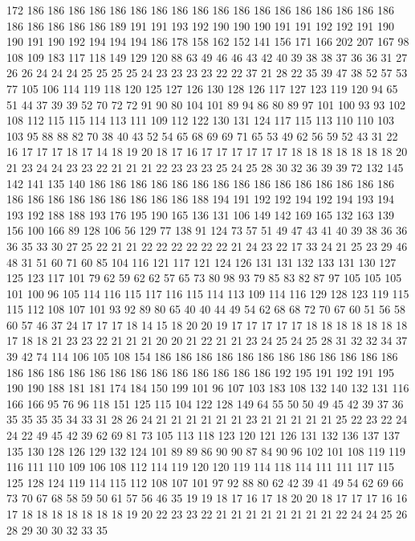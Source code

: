 172 186 186 186 186 186 186 186 186 186 186 186 186 186 186 186 186 186 186 186
186 186 186 186 189 191 191 193 192 190 190 190 191 191 192 192 191 190 190 191
190 192 194 194 194 186 178 158 162 152 141 156 171 166 202 207 167 98 108 109
183 117 118 149 129 120 88 63 49 46 46 43 42 40 39 38 38 37 36 36
31 27 26 26 24 24 24 25 25 25 25 24 23 23 23 23 22 22 37 21
28 22 35 39 47 38 52 57 53 77 105 106 114 119 118 120 125 127 126 130
128 126 117 127 123 119 120 94 65 51 44 37 39 39 52 70 72 72 91 90
80 104 101 89 94 86 80 89 97 101 100 93 93 102 108 112 115 115 114 113
111 109 112 122 130 131 124 117 115 113 110 110 103 103 95 88 88 82 70 38
40 43 52 54 65 68 69 69 71 65 53 49 62 56 59 52 43 31 22 16
17 17 17 18 17 14 18 19 20 18 17 16 17 17 17 17 17 17 18 18
18 18 18 18 18 20 21 23 24 24 23 23 22 21 21 21 22 23 23 23
25 24 25 28 30 32 36 39 39 72 132 145 142 141 135 140 186 186 186 186
186 186 186 186 186 186 186 186 186 186 186 186 186 186 186 186 186 186 186 186
188 194 191 192 192 194 192 194 193 194 193 192 188 188 193 176 195 190 165 136
131 106 149 142 169 165 132 163 139 156 100 166 89 128 106 56 129 77 138 91
124 73 57 51 49 47 43 41 40 39 38 36 36 36 35 33 30 27 25 22
21 21 22 22 22 22 22 22 21 24 23 22 17 33 24 21 25 23 29 46
48 31 51 60 71 60 85 104 116 121 117 121 124 126 131 131 132 133 131 130
127 125 123 117 101 79 62 59 62 62 57 65 73 80 98 93 79 85 83 82
87 97 105 105 105 101 100 96 105 114 116 115 117 116 115 114 113 109 114 116
129 128 123 119 115 115 112 108 107 101 93 92 89 80 65 40 40 44 49 54
62 68 68 72 70 67 60 51 56 58 60 57 46 37 24 17 17 17 18 14
15 18 20 20 19 17 17 17 17 17 18 18 18 18 18 18 18 17 18 18
21 23 23 22 21 21 21 20 20 21 22 21 21 23 24 25 24 25 28 31
32 32 34 37 39 42 74 114 106 105 108 154 186 186 186 186 186 186 186 186
186 186 186 186 186 186 186 186 186 186 186 186 186 186 186 186 186 192 195 191
192 191 195 190 190 188 181 181 174 184 150 199 101 96 107 103 183 108 132 140
132 131 116 166 166 95 76 96 118 151 125 115 104 122 128 149 64 55 50 50
49 45 42 39 37 36 35 35 35 35 34 33 31 28 26 24 21 21 21 21
21 21 23 21 21 21 21 21 25 22 23 22 24 24 22 49 45 42 39 62
69 81 73 105 113 118 123 120 121 126 131 132 136 137 137 135 130 128 126 129
132 124 101 89 89 86 90 90 87 84 90 96 102 101 108 119 119 116 111 110
109 106 108 112 114 119 120 120 119 114 118 114 111 111 117 115 125 128 124 119
114 115 112 108 107 101 97 92 88 80 62 42 39 41 49 54 62 69 66 73
70 67 68 58 59 50 61 57 56 46 35 19 19 18 17 16 17 18 20 20
18 17 17 17 16 16 17 18 18 18 18 18 18 18 19 20 22 23 23 22
21 21 21 21 21 21 21 21 22 24 24 25 26 28 29 30 30 32 33 35
